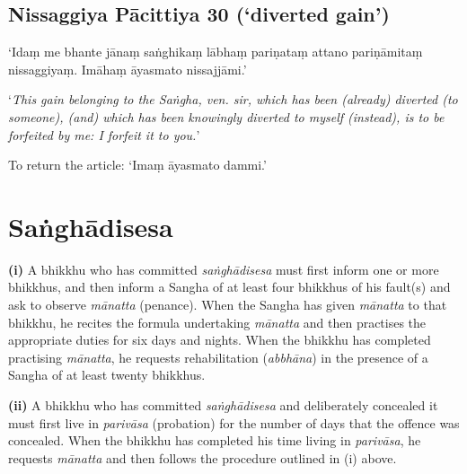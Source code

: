 

\subsection[NP 30 (‘diverted gain’)]{Nissaggiya Pācittiya 30 (‘diverted gain’)}

‘Idaṃ me bhante jānaṃ saṅghikaṃ lābhaṃ pariṇataṃ attano pariṇāmitaṃ nissaggiyaṃ.
Imāhaṃ āyasmato nissajjāmi.’

‘\emph{This gain belonging to the Saṅgha, ven. sir, which has been (already)
  diverted (to someone), (and) which has been knowingly diverted to myself
  (instead), is to be forfeited by me: I forfeit it to you.}’


To return the article: ‘Imaṃ āyasmato dammi.’


\ifhandbookedition
\clearpage
\fi

\section{Saṅghādisesa}

\textbf{(i)} A bhikkhu who has committed \emph{saṅghādisesa} must first inform
one or more bhikkhus, and then inform a Sangha of at least four bhikkhus of his
fault(s) and ask to observe \emph{mānatta} (penance). When the Sangha has given
\emph{mānatta} to that bhikkhu, he recites the formula undertaking
\emph{mānatta} and then practises the appropriate duties for six days and
nights. When the bhikkhu has completed practising \emph{mānatta}, he requests
rehabilitation (\emph{abbhāna}) in the presence of a Sangha of at least twenty
bhikkhus.

\textbf{(ii)} A bhikkhu who has committed \emph{saṅghādisesa} and deliberately
concealed it must first live in \emph{parivāsa} (probation) for the number of
days that the offence was concealed. When the bhikkhu has completed his time
living in \emph{parivāsa}, he requests \emph{mānatta} and then follows the
procedure outlined in (i) above.

